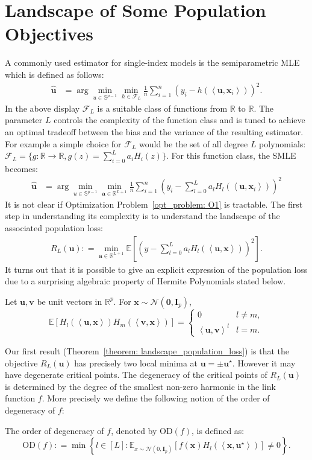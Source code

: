 \documentclass[final,12pt]{colt2018} %
\newcommand{\E}{\mathbb{E}}
\newcommand{\R}{\mathbb{R}}
\newcommand{\sd}[1]{\text{OD}(#1)}
\newcommand{\unitsphere}[1]{\mathbb{S}^{#1}}
\newcommand{\gauss}[2]{\mathcal{N}\left( #1,#2 \right)}
\renewcommand\v[1]{{\ensuremath{\boldsymbol{#1}}}}
\newcommand\ip[1]{\left\langle #1 \right\rangle}
\begin{document}
\section{Landscape of Some Population Objectives}
\label{section: landscape analysis}
A commonly used estimator for single-index models is the semiparametric MLE which is defined as follows:
\begin{align}
         \hat{\v u} &= \arg\min_{u \in \unitsphere{p-1}} \min_{h \in \mathcal{F}_L} \frac{1}{n} \sum_{i=1}^n(y_i - h(\ip{\v u, \v x_i}))^2. \nonumber
\end{align}
In the above display $\mathcal{F}_L$ is a suitable class of functions from $\R$ to $\R$. The parameter $L$ controls the complexity of the function class and is tuned to achieve an optimal tradeoff between the bias and the variance of the resulting estimator. For example a simple choice for $\mathcal{F}_L$ would be the set of all degree $L$ polynomials: $\mathcal{F}_L = \{g: \R \rightarrow \R, g(z) = \sum_{i=0}^L a_i H_i(z) \}$.
For this function class, the SMLE becomes:
\begin{align}
         \hat{\v u} &= \arg\min_{u \in \unitsphere{p-1}} \min_{\v a \in \R^{L+1}} \frac{1}{n} \sum_{i=1}^n\left(y_i - \sum_{l=0}^L a_l H_l(\ip{\v u, \v x_i})\right)^2 \tag{OPT 1} \label{opt_problem: O1}
\end{align}
It is not clear if Optimization Problem~\ref{opt_problem: O1} is tractable. The first step in understanding its complexity is to understand the landscape of the associated population loss:
\begin{align*}
    R_L(\v u) : = \min_{\v a \in \R^{L+1}} \E \left[ \left(y - \sum_{l=0}^L a_l H_l(\ip{\v u, \v x}) \right)^2 \right].
\end{align*}
It turns out that it is possible to give an explicit expression of the population loss due to a surprising algebraic property of Hermite Polynomials stated below. 
\begin{lemma} Let $\v u, \v v$ be unit vectors in $\R^p$. For $\v x \sim \gauss{\v 0}{\v I_p}$, 
\[ \E[H_l(\ip{\v u, \v x}) H_m(\ip{\v v, \v x})] =  \left\{
\begin{array}{ll}
      0 & l\neq m , \\
      \ip{\v u, \v v}^l & l=m .
\end{array} 
\right. \]
\label{lemma: univariate_hermite_key_property}
\end{lemma}

Our first result (Theorem~\ref{theorem: landscape_population_loss}) is that the objective $R_L(\v u)$ has precisely two local minima at $\v u = \pm \v u^\star$. However it may have degenerate critical points. The degeneracy of the critical points of $R_L(\v u)$ is determined by the degree of the smallest non-zero harmonic in the link function $f$. More precisely we define the following notion of the order of degeneracy of $f$:
\begin{definition} The order of degeneracy of $f$, denoted by $\sd{f}$, is defined as:
$$\sd{f}: = \min \left\{l \in [L]: \E_{x\sim \gauss{0}{\v I_p}}\left[f(\v x) H_l(\ip{\v x, \v u^\star})\right] \neq 0\right\}.$$
\label{definition: saddle_degree}
\end{definition}
\end{document}
